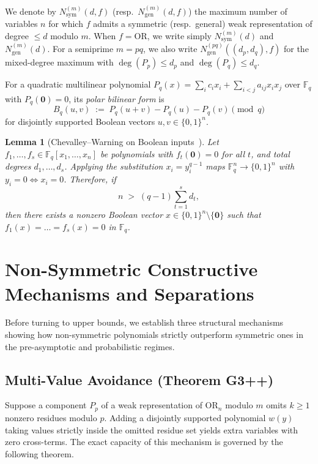 \documentclass[11pt,a4paper]{article}
\newtheorem{lemma}[theorem]{Lemma}
\theoremstyle{definition}
\newcommand{\F}{\mathbb{F}}
\newcommand{\OR}{\mathrm{OR}}
\newcommand{\Nsym}{N_{\mathrm{sym}}}
\newcommand{\Ngen}{N_{\mathrm{gen}}}
\begin{document}
We denote by $\Nsym^{(m)}(d, f)$ (resp.\ $\Ngen^{(m)}(d, f)$) the maximum number of variables $n$ for which $f$ admits a symmetric (resp.\ general) weak representation of degree $\le d$ modulo $m$. When $f = \OR$, we write simply $\Nsym^{(m)}(d)$ and $\Ngen^{(m)}(d)$. For a semiprime $m = pq$, we also write $\Ngen^{(pq)}((d_p, d_q), f)$ for the mixed-degree maximum with $\deg(P_p) \le d_p$ and $\deg(P_q) \le d_q$.

For a quadratic multilinear polynomial $P_q(x) = \sum_i c_i x_i + \sum_{i<j} a_{ij} x_i x_j$ over $\F_q$ with $P_q(\mathbf{0}) = 0$, its \emph{polar bilinear form} is
\[
  B_q(u, v) \;:=\; P_q(u + v) - P_q(u) - P_q(v) \pmod q
\]
for disjointly supported Boolean vectors $u, v \in \{0,1\}^n$.

\begin{lemma}[Chevalley--Warning on Boolean inputs~\cite{Che35,War35}]
\label{lem:cw}
Let $f_1,\dots,f_s \in \F_q[x_1,\dots,x_n]$ be polynomials with $f_t(\mathbf{0}) = 0$ for all $t$, and total degrees $d_1,\dots,d_s$. Applying the substitution $x_i = y_i^{q-1}$ maps $\F_q^n \to \{0,1\}^n$ with $y_i = 0 \iff x_i = 0$. Therefore, if
\[
  n \;>\; (q - 1)\sum_{t=1}^s d_t,
\]
then there exists a nonzero Boolean vector $x \in \{0,1\}^n \setminus \{\mathbf{0}\}$ such that $f_1(x) = \dots = f_s(x) = 0$ in $\F_q$.
\end{lemma}

\section{Non-Symmetric Constructive Mechanisms and Separations}
\label{sec:mechanisms}

Before turning to upper bounds, we establish three structural mechanisms showing how non-symmetric polynomials strictly outperform symmetric ones in the pre-asymptotic and probabilistic regimes.

\subsection{Multi-Value Avoidance (Theorem G3++)}

Suppose a component $P_p$ of a weak representation of $\OR_n$ modulo $m$ omits $k \ge 1$ nonzero residues modulo $p$. Adding a disjointly supported polynomial $w(y)$ taking values strictly inside the omitted residue set yields extra variables with zero cross-terms. The exact capacity of this mechanism is governed by the following theorem.
\end{document}
